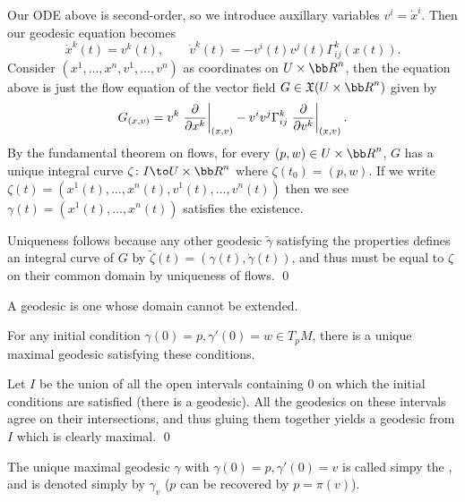 \ethrm

\bproof

    Our ODE above is second-order, so we introduce auxillary variables $v^i=\dot x^i$.
    Then our geodesic equation becomes
    $$ \dot x^k(t) = v^k(t),\qquad \dot v^k(t) = -v^i(t)v^j(t)\Gamma^k_{ij}(x(t)) . $$
    Consider $(x^1,\dots,x^n,v^1,\dots,v^n)$ as coordinates on $U\times\bR^n$, then the equation above is just the flow equation
    of the vector field $G\in\X(U\times\bR^n)$ given by
    $$ G_{(x,v)} = v^k\left.{{\partial }\over{\partial x^k}}\right|_{(x,v)} - v^iv^j\Gamma^k_{ij}\left.{{\partial }\over{\partial v^k}}\right|_{(x,v)} . $$
    By the fundamental theorem on flows, for every $(p,w)\in U\times\bR^n$, $G$ has a unique integral curve $\zeta\colon I\to U\times\bR^n$ where
    $\zeta(t_0)=(p,w)$.
    If we write $\zeta(t)=(x^1(t),\dots,x^n(t),v^1(t),\dots,v^n(t))$ then we see $\gamma(t)=(x^1(t),\dots,x^n(t))$ satisfies the existence.

    Uniqueness follows because any other geodesic $\tilde\gamma$ satisfying the properties defines an integral curve of $G$ by
    $\tilde\zeta(t)=(\gamma(t),\dot\gamma(t))$, and thus must be equal to $\zeta$ on their common domain by uniqueness of flows.
    \qed

\eproof

\bdefn

    A  geodesic is one whose domain cannot be extended.

\edefn

\bcoro

    For any initial condition $\gamma(0)=p,\gamma'(0)=w\in T_pM$, there is a unique maximal geodesic satisfying these conditions.

\ecoro

\bproof

    Let $I$ be the union of all the open intervals containing $0$ on which the initial conditions are satisfied (there is a geodesic).
    All the geodesics on these intervals agree on their intersections, and thus gluing them together yields a geodesic from $I$ which is
    clearly maximal.
    \qed

\eproof

\bdefn

    The unique maximal geodesic $\gamma$ with $\gamma(0)=p,\gamma'(0)=v$ is called simpy the , and is denoted simply by $\gamma_v$ ($p$ can be recovered by $p=\pi(v)$).

\edefn

